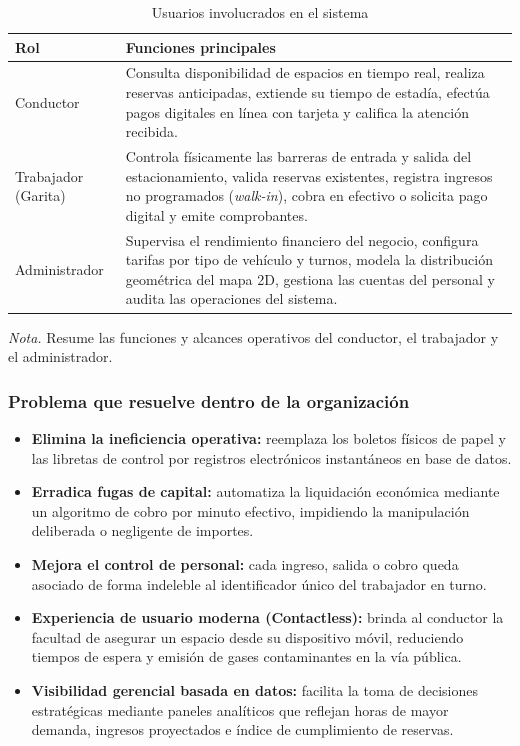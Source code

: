 \begin{table}[htbp]
\caption{Usuarios involucrados en el sistema}
\label{tab:usuarios}
\begin{tabular}{@{}p{5cm} p{10cm}@{}}
\toprule
\textbf{Rol} & \textbf{Funciones principales} \\
\midrule
Conductor & Consulta disponibilidad de espacios en tiempo real, realiza reservas anticipadas, extiende su tiempo de estadía, efectúa pagos digitales en línea con tarjeta y califica la atención recibida. \\
Trabajador (Garita) & Controla físicamente las barreras de entrada y salida del estacionamiento, valida reservas existentes, registra ingresos no programados (\textit{walk-in}), cobra en efectivo o solicita pago digital y emite comprobantes. \\
Administrador & Supervisa el rendimiento financiero del negocio, configura tarifas por tipo de vehículo y turnos, modela la distribución geométrica del mapa 2D, gestiona las cuentas del personal y audita las operaciones del sistema. \\
\bottomrule
\end{tabular}
\par\vspace{0.2cm}
\textit{Nota.} Resume las funciones y alcances operativos del conductor, el trabajador y el administrador.
\end{table}

\subsubsection{Problema que resuelve dentro de la organización}



\begin{itemize}
    \item \textbf{Elimina la ineficiencia operativa:} reemplaza los boletos físicos de papel y las libretas de control por registros electrónicos instantáneos en base de datos.
    \item \textbf{Erradica fugas de capital:} automatiza la liquidación económica mediante un algoritmo de cobro por minuto efectivo, impidiendo la manipulación deliberada o negligente de importes.
    \item \textbf{Mejora el control de personal:} cada ingreso, salida o cobro queda asociado de forma indeleble al identificador único del trabajador en turno.
    \item \textbf{Experiencia de usuario moderna (Contactless):} brinda al conductor la facultad de asegurar un espacio desde su dispositivo móvil, reduciendo tiempos de espera y emisión de gases contaminantes en la vía pública.
    \item \textbf{Visibilidad gerencial basada en datos:} facilita la toma de decisiones estratégicas mediante paneles analíticos que reflejan horas de mayor demanda, ingresos proyectados e índice de cumplimiento de reservas.
\end{itemize}


